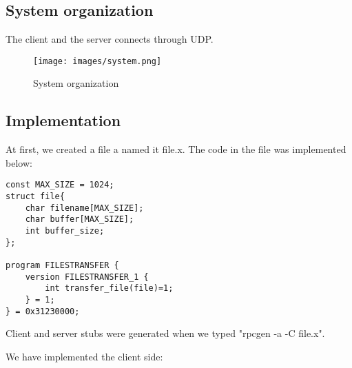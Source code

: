 \documentclass[13pt]{article}
\begin{document}
\subsection{System organization}
\noindent%
The client and the server connects through UDP.

\begin{figure}[H]
    \centering
    \texttt{[image: images/system.png]}
    \caption{System organization}
\end{figure}

\subsection{Implementation}
\noindent%
At first, we created a file a named it file.x. The code in the file was implemented below:
\begin{verbatim}
const MAX_SIZE = 1024;
struct file{
    char filename[MAX_SIZE];
    char buffer[MAX_SIZE];
    int buffer_size;
};

program FILESTRANSFER {
	version FILESTRANSFER_1 {
		int transfer_file(file)=1;
	} = 1;
} = 0x31230000;
\end{verbatim}

\noindent%
Client and server stubs were generated when we typed "rpcgen -a -C file.x".

\noindent%
We have implemented the client side:
\end{document}
